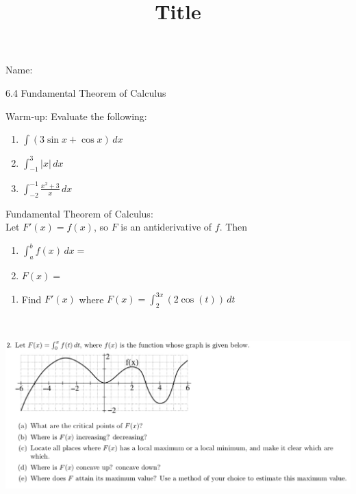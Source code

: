 \documentclass[12pt]{article}
\title{Title}
\begin{document}

 Name:
 \begin{center}\large{6.4 Fundamental Theorem of Calculus}\end{center}

Warm-up: Evaluate the following:
\begin{enumerate}
\item $\displaystyle \int (3\sin x + \cos x)\,dx$\\

\item $\displaystyle \int_{-1}^3 |x| \,dx$\\

\item $\displaystyle \int_{-2}^{-1} \frac{x^2+3}{x}\,dx$\\

\end{enumerate}

\begin{tcolorbox}
Fundamental Theorem of Calculus:\\

Let $F'(x)=f(x)$, so $F$ is an antiderivative of $f$. Then\\
\begin{enumerate}
\item $\displaystyle \int_a^b f(x)\,dx=$\\

\item $F(x)=$\\
\end{enumerate}
\end{tcolorbox}


\begin{enumerate}
\item Find $F'(x)$ where $\displaystyle F(x)= \int_2^{3x} (2\cos(t))\,dt$\\
\end{enumerate}

\newpage
~

\includegraphics [width=\textwidth]{6_4_FTCa}
\end{document}
